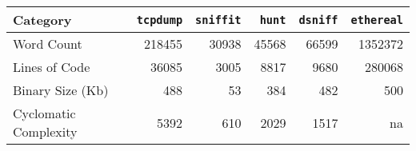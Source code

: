 \begin{tabular}{|p{3.75cm}|r|r|r|r|r|}\hline
Category                & {\tt tcpdump} & {\tt sniffit} & {\tt hunt}  &
{\tt dsniff}  & {\tt ethereal} \\ \hline\hline
Word Count & 218455 & 30938   & 45568 & 66599   & 1352372\\ \hline
Lines of Code & 36085  & 3005    & 8817  & 9680    & 280068\\ \hline
Binary Size (Kb) & 488    & 53      & 384   & 482     & 500\\ \hline
Cyclomatic Complexity & 5392   &610      & 2029  & 1517    & na\\ \hline
\end{tabular}


